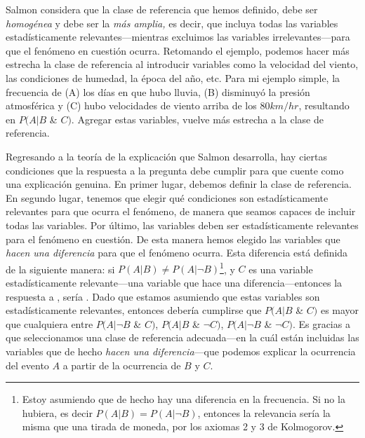 Salmon considera que la clase de referencia que hemos
definido, debe ser \emph{homogénea} y debe ser la \emph{más
amplia,} es decir, que incluya todas las variables
estadísticamente relevantes---mientras excluimos las
variables irrelevantes---para que el fenómeno en cuestión
ocurra. Retomando el ejemplo, podemos hacer más estrecha la
clase de referencia al introducir variables como la
velocidad del viento, las condiciones de humedad, la época
del año, etc. Para mi ejemplo simple, la frecuencia de (A)
los días en que hubo lluvia, (B) disminuyó la presión
atmosférica y (C) hubo velocidades de viento arriba de los $
80km/hr $, resultando en $ P( A | B$ \& $ C ) $. Agregar
estas variables, vuelve más estrecha a la clase de
referencia.

Regresando a la teoría de la explicación que Salmon
desarrolla, hay ciertas condiciones que la respuesta a la
pregunta  debe cumplir para que
cuente como una explicación genuina. En primer lugar,
debemos definir la clase de referencia. En segundo lugar,
tenemos que elegir qué condiciones son estadísticamente
relevantes para que ocurra el fenómeno, de manera que seamos
capaces de incluir todas las variables. Por último, las
variables deben ser estadísticamente relevantes para el
fenómeno en cuestión. De esta manera hemos elegido las
variables que \emph{hacen una diferencia} para que el
fenómeno ocurra. Esta diferencia está definida de la
siguiente manera: si $ P( A | B ) \neq P( A | \neg{ B } )
$\footnote{
  Estoy asumiendo que de hecho hay una diferencia en la
  frecuencia. Si no la hubiera, es decir $ P( A | B ) = P( A
  | \neg{ B } ) $, entonces la relevancia sería la misma que
  una tirada de moneda, por los axiomas 2 y	3 de Kolmogorov. 
},
y $C$ es una variable estadísticamente relevante---una
variable que hace una diferencia---entonces la respuesta a
, sería . Dado que estamos asumiendo que estas variables son
estadísticamente relevantes, entonces debería cumplirse que
$ P( A | B$ \& $C )$ es mayor que cualquiera entre $ P( A |
\neg{ B }$ \& $C ) $, $ P( A | B$ \& $\neg{ C } ) $, $ P( A
| \neg{ B }$ \& $\neg{ C } ) $. Es gracias a que
seleccionamos una clase de referencia adecuada---en la cuál
están incluidas las variables que de hecho \emph{hacen una
diferencia}---que podemos explicar la ocurrencia del evento
$ A $ a partir de la ocurrencia de $ B $ y $ C $.

